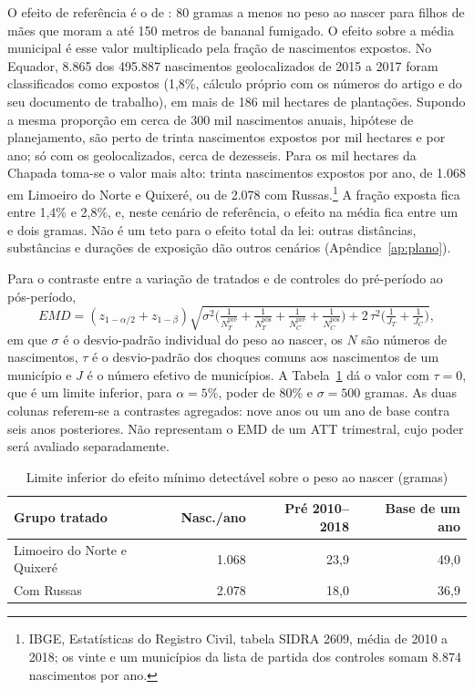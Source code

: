O efeito de referência é o de : 80 gramas a menos
no peso ao nascer para filhos de mães que moram a até 150 metros de bananal
fumigado. O efeito sobre a média municipal é esse valor multiplicado pela
fração de nascimentos expostos. No Equador, 8.865 dos 495.887 nascimentos
geolocalizados de 2015 a 2017 foram classificados como expostos (1,8\%, cálculo
próprio com os números do artigo e do seu documento de trabalho), em mais de 186 mil hectares de plantações.
Supondo a mesma proporção em cerca de 300 mil nascimentos anuais, hipótese de
planejamento, são perto de trinta nascimentos expostos por mil hectares e por
ano; só com os geolocalizados, cerca de dezesseis. Para os mil hectares da
Chapada toma-se o valor mais alto: trinta nascimentos expostos por ano, de 1.068 em Limoeiro do Norte e
Quixeré, ou de 2.078 com Russas.\footnote{IBGE, Estatísticas do Registro Civil,
tabela SIDRA 2609, média de 2010 a 2018; os vinte e um municípios da lista de partida dos controles somam 8.874 nascimentos por ano.} A fração exposta fica entre 1,4\% e 2,8\%, e,
neste cenário de referência, o efeito na média fica entre um e dois gramas. Não
é um teto para o efeito total da lei: outras distâncias, substâncias e durações
de exposição dão outros cenários (Apêndice~\ref{ap:plano}).

Para o contraste entre a variação de tratados e de controles do pré-período ao
pós-período,
\[
EMD = (z_{1-\alpha/2} + z_{1-\beta})
\sqrt{\sigma^2\Big(\tfrac{1}{N_{T}^{\text{pré}}} + \tfrac{1}{N_{T}^{\text{pós}}} +
\tfrac{1}{N_{C}^{\text{pré}}} + \tfrac{1}{N_{C}^{\text{pós}}}\Big) + 2\,\tau^2\Big(\tfrac{1}{J_T}+\tfrac{1}{J_C}\Big)},
\]
em que $\sigma$ é o desvio-padrão individual do peso ao nascer, os $N$ são
números de nascimentos, $\tau$ é o desvio-padrão dos choques comuns aos
nascimentos de um município e $J$ é o número efetivo de municípios. A
Tabela~\ref{tab:emd} dá o valor com $\tau = 0$, que é um limite inferior, para
$\alpha = 5\%$, poder de 80\% e $\sigma = 500$ gramas. As duas colunas
referem-se a contrastes agregados: nove anos ou um ano de base contra seis anos
posteriores. Não representam o EMD de um ATT trimestral, cujo poder será
avaliado separadamente.

\begin{table}[ht]
\centering\small
\caption{Limite inferior do efeito mínimo detectável sobre o peso ao nascer
(gramas)}
\label{tab:emd}
\begin{tabular}{@{}lrrr@{}}
\toprule
Grupo tratado & Nasc./ano & Pré 2010--2018 & Base de um ano \\
\midrule
Limoeiro do Norte e Quixeré & 1.068 & 23,9 & 49,0 \\
Com Russas                   & 2.078 & 18,0 & 36,9 \\
\bottomrule
\end{tabular}
\end{table}


